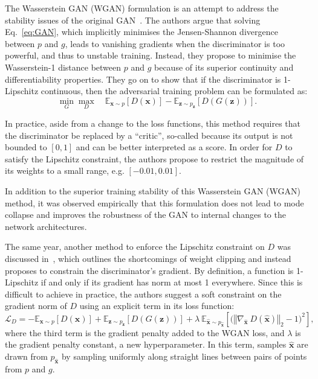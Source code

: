 The Wasserstein GAN (WGAN) formulation is an attempt to address the stability issues of the original GAN~\cite{arjovsky2017wasserstein}. The authors argue that solving Eq.~\ref{eq:GAN}, which implicitly minimises the Jensen-Shannon divergence between $p$ and $g$, leads to vanishing gradients when the discriminator is too powerful, and thus to unstable training.
Instead, they propose to minimise the Wasserstein-1 distance between $p$ and $g$ because of its superior continuity and differentiability properties. They go on to show that if the discriminator is 1-Lipschitz continuous, then the adversarial training problem can be formulated as:
\begin{equation}
    \min_G \max_D \quad 
        \mathbb{E}_{\mathbf{x} \sim p} \left[ D(\mathbf{x}) \right] - 
        \mathbb{E}_{\mathbf{z} \sim p_\mathbf{z}} \left[ D(G(\mathbf{z})) \right].
\end{equation}

In practice, aside from a change to the loss functions, this method requires that the discriminator be replaced by a ``critic'', so-called because its output is not bounded to $[0, 1]$ and can be better interpreted as a score. In order for $D$ to satisfy the Lipschitz constraint, the authors propose to restrict the magnitude of its weights to a small range, e.g. $[-0.01, 0.01]$.

In addition to the superior training stability of this Wasserstein GAN (WGAN) method, it was observed empirically that this formulation does not lead to mode collapse and improves the robustness of the GAN to internal changes to the network architectures.

The same year, another method to enforce the Lipschitz constraint on $D$ was discussed in~\cite{NIPS2017_892c3b1c}, which outlines the shortcomings of weight clipping and instead proposes to constrain the discriminator's gradient.
By definition, a function is 1-Lipschitz if and only if its gradient has norm at most 1 everywhere. Since this is difficult to achieve in practice, the authors suggest a soft constraint on the gradient norm of $D$ using an explicit term in its loss function:
\begin{equation}\label{eq:WGAN-GP}
    \mathcal{L}_D = 
        -\mathbb{E}_{\mathbf{x} \sim p} \left[ D(\mathbf{x}) \right] +
        \mathbb{E}_{\mathbf{z} \sim p_\mathbf{z}} \left[ D(G(\mathbf{z})) \right] +
        \lambda\ \mathbb{E}_{\hat{\mathbf{x}} \sim p_{\hat{\mathbf{x}}}}
            \left[ \big( \left\Vert \nabla_{\hat{\mathbf{x}}}\ D(\hat{\mathbf{x}}) \right\Vert_2 - 1 \big) ^2 \right],
\end{equation}
where the third term is the gradient penalty added to the WGAN loss, and $\lambda$ is the gradient penalty constant, a new hyperparameter. In this term, samples $\hat{\mathbf{x}}$ are drawn from $p_{\hat{\mathbf{x}}}$ by sampling uniformly along straight lines between pairs of points from $p$ and $g$. 

